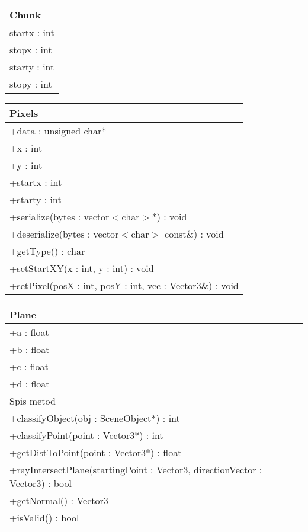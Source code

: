 \begin{center}
    \begin{tabular}{|l|}
    \hline
    Chunk \\ \hline
    startx : int \\
    stopx : int \\
    starty : int \\
    stopy : int \\
    \hline
    \end{tabular}
\end{center}


\begin{center}
    \begin{tabular}{|l|}
    \hline
    Pixels \\ \hline
    +data : unsigned char* \\
    +x : int \\
    +y : int \\ 
    +startx : int \\
    +starty : int \\
    \hline
	+serialize(bytes : vector$<$char$>$*) : void \\
	+deserialize(bytes : vector$<$char$>$ const\&) : void \\
	+getType() : char \\
	+setStartXY(x : int, y : int) : void \\
	+setPixel(posX : int, posY : int, vec : Vector3\&) : void \\
	\hline
    \end{tabular}
\end{center}

\begin{center}
    \begin{tabular}{|l|}
    \hline
    Plane \\ \hline
    +a : float \\ 
    +b : float \\
    +c : float \\
    +d : float \\
    \hline
	Spis metod \\ 
	+classifyObject(obj : SceneObject*) : int \\
	+classifyPoint(point : Vector3*) : int \\
	+getDistToPoint(point : Vector3*) : float \\
	+rayIntersectPlane(startingPoint : Vector3, directionVector : Vector3) : bool \\
	+getNormal() : Vector3 \\
	+isValid() : bool \\
	\hline
    \end{tabular}
\end{center}


